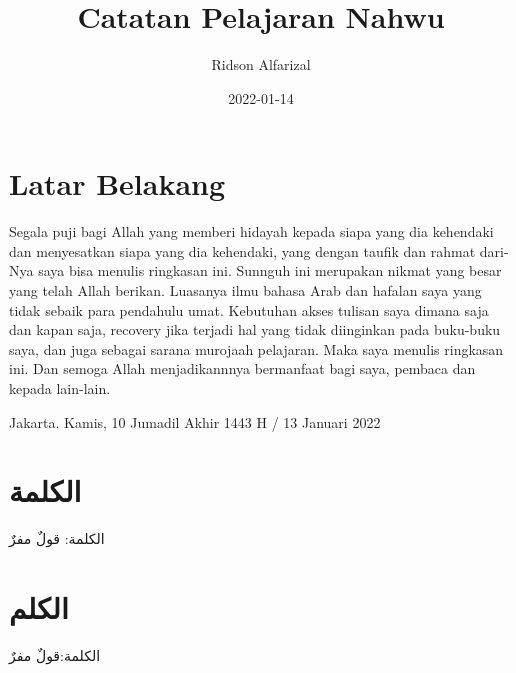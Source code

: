 \documentclass[
]{book}
\title{Catatan Pelajaran Nahwu}
\author{Ridson Alfarizal}
\date{2022-01-14}
\begin{document}
\maketitle

{
\setcounter{tocdepth}{1}
\tableofcontents
}
\hypertarget{latar-belakang}{%
\chapter{Latar Belakang}\label{latar-belakang}}

Segala puji bagi Allah yang memberi hidayah kepada siapa yang dia kehendaki dan menyesatkan siapa yang dia kehendaki, yang dengan taufik dan rahmat dari-Nya saya bisa menulis ringkasan ini. Sunnguh ini merupakan nikmat yang besar yang telah Allah berikan. Luasanya ilmu bahasa Arab dan hafalan saya yang tidak sebaik para pendahulu umat. Kebutuhan akses tulisan saya dimana saja dan kapan saja, recovery jika terjadi hal yang tidak diinginkan pada buku-buku saya, dan juga sebagai sarana murojaah pelajaran. Maka saya menulis ringkasan ini. Dan semoga Allah menjadikannnya bermanfaat bagi saya, pembaca dan kepada lain-lain.

Jakarta. Kamis, 10 Jumadil Akhir 1443 H / 13 Januari 2022

\hypertarget{ux627ux644ux643ux644ux645ux629}{%
\chapter{الكلمة}\label{ux627ux644ux643ux644ux645ux629}}

الكلمة: قولٌ مفرٌ

\hypertarget{ux627ux644ux643ux644ux645}{%
\chapter{الكلم}\label{ux627ux644ux643ux644ux645}}

الكلمة:قولٌ مفرٌ

  
\end{document}

